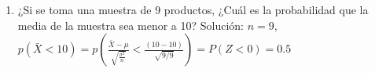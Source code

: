 \documentclass[addpoints]{exam}
\theoremstyle{mytheor}
\begin{document}
\begin{questions}
\begin{enumerate}
  \item ¿Si se toma una muestra de 9 productos, ¿Cuál es la probabilidad que la media de la muestra sea menor a 10?
  \subitem Solución: $n = 9$, $p(\bar{X}<10) = p(\frac{\bar{X}-\mu}{\sqrt{\frac{\sigma^2}{n}}}<\frac{(10-10)}{\sqrt{9/9}}) = P(Z<0) = 0.5$
  
  \end{enumerate}

  \end{questions}

  
\end{document}
